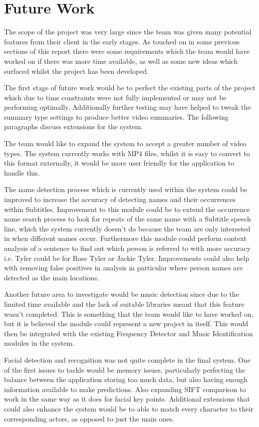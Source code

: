 \section{Future Work}
\label{sec:FutureWork}
The scope of the project was very large since the team was given many potential features from their client in the early stages. As touched on in some previous 
sections of this report there were some requirements which the team would have worked on if there was more time available, as well as some new ideas which 
surfaced whilst the project has been developed.

The first stage of future work would be to perfect the existing parts of the project which due to time constraints were not fully implemented or may not 
be performing optimally. Additionally further testing may have helped to tweak the summary type settings to produce better video summaries. The following 
paragraphs discuss extensions for the system.

The team would like to expand the system to accept a greater number of video types. The system currently works with MP4 files, whilst it is easy to 
convert to this format externally, it would be more user friendly for the application to handle this.

The name detection process which is currently used within the system could be improved to increase the accuracy of detecting names and their occurrences 
within Subtitles. Improvement to this module could be to extend the occurrence name search process to look for repeats of the same name with a Subtitle 
speech line, which the system currently doesn’t do because the team are only interested in when different names occur. Furthermore this module could
 perform context analysis of a sentence to find out which person is referred to with more accuracy i.e. Tyler could be for Rose Tyler or Jackie Tyler. 
Improvements could also help with removing false positives in analysis in particular where person names are detected as the main locations.

Another future area to investigate would be music detection since due to the limited time available and the lack of suitable libraries meant that this feature 
wasn’t completed. This is something that the team would like to have worked on, but it is believed the module could represent a new project in itself. This would 
then be integrated with the existing Frequency Detector and Music Identification modules in the system.

Facial detection and recognition was not quite complete in the final system. One of the first issues to tackle would be memory issues, particularly 
perfecting the balance between the application storing too much data, but also having enough information available to make predictions. Also 
expanding SIFT comparison to work in the same way as it does for facial key points. Additional extensions that could also enhance the system would be to 
able to match every character to their corresponding actors, as opposed to just the main ones.


